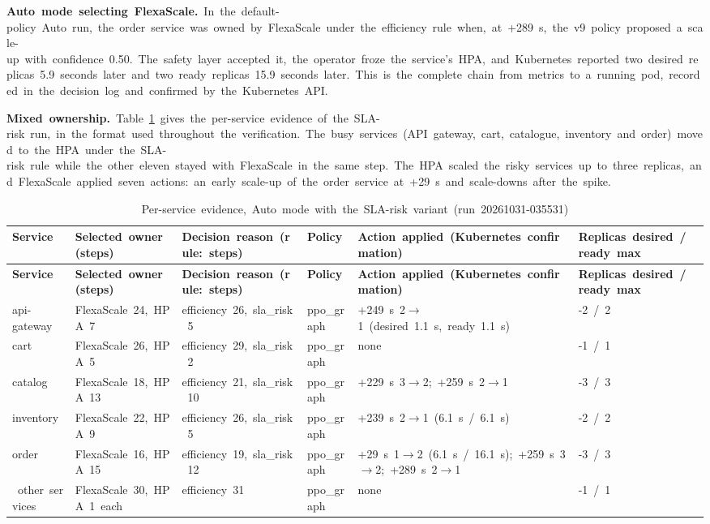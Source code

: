 \documentclass[12pt,a4paper,oneside]{report}
\begin{document}
\textbf{Auto~mode~selecting~FlexaScale.}~In~the~default-policy~Auto~run,~the~order~service~was~owned~by~FlexaScale~under~the~efficiency~rule~when,~at~+289~s,~the~v9~policy~proposed~a~scale-up~with~confidence~0.50.~The~safety~layer~accepted~it,~the~operator~froze~the~service's~HPA,~and~Kubernetes~reported~two~desired~replicas~5.9~seconds~later~and~two~ready~replicas~15.9~seconds~later.~This~is~the~complete~chain~from~metrics~to~a~running~pod,~recorded~in~the~decision~log~and~confirmed~by~the~Kubernetes~API.


\textbf{Mixed~ownership.}~Table~\ref{tab:evidence}~gives~the~per-service~evidence~of~the~SLA-risk~run,~in~the~format~used~throughout~the~verification.~The~busy~services~(API~gateway,~cart,~catalogue,~inventory~and~order)~moved~to~the~HPA~under~the~SLA-risk~rule~while~the~other~eleven~stayed~with~FlexaScale~in~the~same~step.~The~HPA~scaled~the~risky~services~up~to~three~replicas,~and~FlexaScale~applied~seven~actions:~an~early~scale-up~of~the~order~service~at~+29~s~and~scale-downs~after~the~spike.


\begingroup\small\setlength{\tabcolsep}{4pt}\renewcommand{\arraystretch}{1.25}
\begin{longtable}{|>{\raggedright\arraybackslash}p{1.49cm}|>{\raggedright\arraybackslash}p{2.17cm}|>{\raggedright\arraybackslash}p{2.31cm}|>{\raggedright\arraybackslash}p{1.63cm}|>{\raggedright\arraybackslash}p{4.07cm}|>{\raggedright\arraybackslash}p{1.90cm}|}
\caption{Per-service~evidence,~Auto~mode~with~the~SLA-risk~variant~(run~20261031-035531)}\label{tab:evidence}\\\hline
\textbf{Service} & \textbf{Selected~owner~(steps)} & \textbf{Decision~reason~(rule:~steps)} & \textbf{Policy} & \textbf{Action~applied~(Kubernetes~confirmation)} & \textbf{Replicas~desired~/~ready~max}\\\hline\endfirsthead
\hline \textbf{Service} & \textbf{Selected~owner~(steps)} & \textbf{Decision~reason~(rule:~steps)} & \textbf{Policy} & \textbf{Action~applied~(Kubernetes~confirmation)} & \textbf{Replicas~desired~/~ready~max}\\\hline\endhead
api-gateway & FlexaScale~24,~HPA~7 & efficiency~26,~sla\_risk~5 & ppo\_graph & +249~s~2$\rightarrow$1~(desired~1.1~s,~ready~1.1~s) & 1-2~/~2\\\hline
cart & FlexaScale~26,~HPA~5 & efficiency~29,~sla\_risk~2 & ppo\_graph & none & 1-1~/~1\\\hline
catalog & FlexaScale~18,~HPA~13 & efficiency~21,~sla\_risk~10 & ppo\_graph & +229~s~3$\rightarrow$2;~+259~s~2$\rightarrow$1 & 1-3~/~3\\\hline
inventory & FlexaScale~22,~HPA~9 & efficiency~26,~sla\_risk~5 & ppo\_graph & +239~s~2$\rightarrow$1~(6.1~s~/~6.1~s) & 1-2~/~2\\\hline
order & FlexaScale~16,~HPA~15 & efficiency~19,~sla\_risk~12 & ppo\_graph & +29~s~1$\rightarrow$2~(6.1~s~/~16.1~s);~+259~s~3$\rightarrow$2;~+289~s~2$\rightarrow$1 & 1-3~/~3\\\hline
11~other~services & FlexaScale~30,~HPA~1~each & efficiency~31 & ppo\_graph & none & 1-1~/~1\\\hline
\end{longtable}\endgroup
\end{document}
